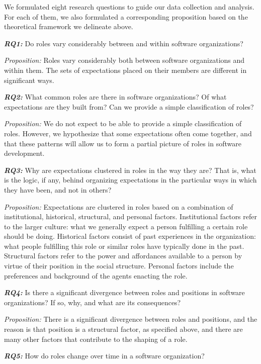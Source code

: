 \documentclass[10pt, conference, compsocconf]{IEEEtran}
\begin{document}
We formulated eight research questions to guide our data collection and analysis. For each of them, we also formulated a corresponding proposition based on the theoretical framework we delineate above.

\textbf{\emph{RQ1:}} Do roles vary considerably between and within software organizations?

\emph{Proposition:} Roles vary considerably both between software organizations and within them. The sets of expectations placed on their members are different in significant ways.

\textbf{\emph{RQ2:}} What common roles are there in software organizations? Of what expectations are they built from? Can we provide a simple classification of roles?

\emph{Proposition:} We do not expect to be able to provide a simple classification of roles. However, we hypothesize that some expectations often come together, and that these patterns will allow us to form a partial picture of roles in software development.

\textbf{\emph{RQ3:}} Why are expectations clustered in roles in the way they are? That is, what is the logic, if any, behind organizing expectations in the particular ways in which they have been, and not in others?

\emph{Proposition:} Expectations are clustered in roles based on a combination of institutional, historical, structural, and personal factors. Institutional factors refer to the larger culture: what we generally expect a person fulfilling a certain role should be doing. Historical factors consist of past experiences in the organization: what people fulfilling this role or similar roles have typically done in the past. Structural factors refer to the power and affordances available to a person by virtue of their position in the social structure. Personal factors include the preferences and background of the agents enacting the role.

\textbf{\emph{RQ4:}} Is there a significant divergence between roles and positions in software organizations? If so, why, and what are its consequences?

\emph{Proposition:} There is a significant divergence between roles and positions, and the reason is that position is a structural factor, as specified above, and there are many other factors that contribute to the shaping of a role.

\textbf{\emph{RQ5:}} How do roles change over time in a software organization?
\end{document}
